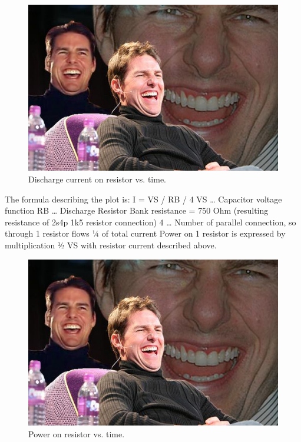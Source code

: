 \begin{figure}[H]
	\centering
	\includegraphics[width=\textwidth]{./img/tsal-wiring.jpg}
	\caption{Discharge current on resistor vs. time.}
	\label{fig:dis-curr}
\end{figure}

The formula describing the plot is:
I = VS / RB / 4
VS … Capacitor voltage function
RB … Discharge Resistor Bank resistance = 750 Ohm (resulting resistance of 2s4p 1k5 resistor connection)
4 … Number of parallel connection, so through 1 resistor flows ¼ of total current
Power on 1 resistor is expressed by multiplication ½ VS with resistor current described above.

\begin{figure}[H]
	\centering
	\includegraphics[width=\textwidth]{./img/tsal-wiring.jpg}
	\caption{Power on resistor vs. time.}
	\label{fig:dis-res}
\end{figure}

